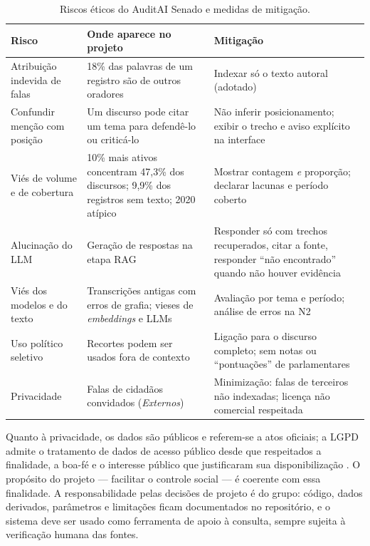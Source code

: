 \documentclass[12pt]{article}
\begin{document}
\begin{table}[ht]
\centering
\caption{Riscos éticos do AuditAI Senado e medidas de mitigação.}
\label{tab:etica}
\footnotesize
\begin{tabularx}{\textwidth}{@{}p{3.1cm}YY@{}}
\toprule
\textbf{Risco} & \textbf{Onde aparece no projeto} & \textbf{Mitigação} \\
\midrule
Atribuição indevida de falas & 18\% das palavras de um registro são de outros oradores & Indexar só o texto autoral (adotado) \\
Confundir menção com posição & Um discurso pode citar um tema para defendê-lo ou criticá-lo & Não inferir posicionamento; exibir o trecho e aviso explícito na interface \\
Viés de volume e de cobertura & 10\% mais ativos concentram 47,3\% dos discursos; 9,9\% dos registros sem texto; 2020 atípico & Mostrar contagem \emph{e} proporção; declarar lacunas e período coberto \\
Alucinação do LLM & Geração de respostas na etapa RAG & Responder só com trechos recuperados, citar a fonte, responder ``não encontrado'' quando não houver evidência \\
Viés dos modelos e do texto & Transcrições antigas com erros de grafia; vieses de \textit{embeddings} e LLMs & Avaliação por tema e período; análise de erros na N2 \\
Uso político seletivo & Recortes podem ser usados fora de contexto & Ligação para o discurso completo; sem notas ou ``pontuações'' de parlamentares \\
Privacidade & Falas de cidadãos convidados (\textit{Externos}) & Minimização: falas de terceiros não indexadas; licença não comercial respeitada \\
\bottomrule
\end{tabularx}
\end{table}

Quanto à privacidade, os dados são públicos e referem-se a atos oficiais; a LGPD admite o
tratamento de dados de acesso público desde que respeitados a finalidade, a boa-fé e o interesse
público que justificaram sua disponibilização \cite{brasil2018}. O propósito do projeto ---
facilitar o controle social --- é coerente com essa finalidade. A responsabilidade pelas decisões
de projeto é do grupo: código, dados derivados, parâmetros e limitações ficam documentados no
repositório, e o sistema deve ser usado como ferramenta de apoio à consulta, sempre sujeita à
verificação humana das fontes.
\end{document}
